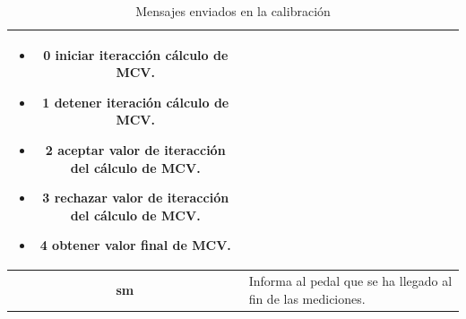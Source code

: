 \begin{table}[h]
\begin{tabular}{ |c|p{14cm}|}
\begin{minipage}{14cm}
\begin{itemize}
                                    \begin{itemize}
                                        \item 0 iniciar iteracción cálculo de MCV.
                                        \item 1 detener iteración cálculo de MCV.
                                        \item 2 aceptar valor de iteracción del cálculo de MCV.
                                        \item 3 rechazar valor de iteracción del cálculo de MCV.
                                        \item 4 obtener valor final de MCV.
                                    \end{itemize}
                                \end{itemize} 
                                \vspace{1pt}
                            \end{minipage}\\\hline
        \textbf{sm}     &   Informa al pedal que se ha llegado al fin de las mediciones. \\\hline               

    \end{tabular}
    \caption{Mensajes enviados en la calibración}
    \label{table:send-msg-in-calibration}
\end{table}  

